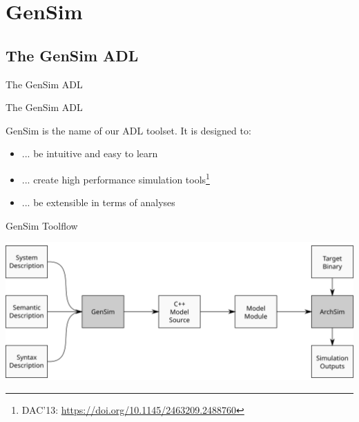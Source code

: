 \section{GenSim}

\subsection{The GenSim ADL}

\begin{frame}{The GenSim ADL}

\end{frame}

\begin{frame}{The GenSim ADL}

GenSim is the name of our ADL toolset. It is designed to:

\begin{itemize}
	\item ... be intuitive and easy to learn
	\item ... create high performance simulation tools\footnote{DAC'13: \url{https://doi.org/10.1145/2463209.2488760}}
	\item ... be extensible in terms of analyses

\end{itemize}

\end{frame}

\begin{frame}{GenSim Toolflow}

\centering
\includegraphics[width=\textwidth]{figures/gensim-toolflow}

\end{frame}

